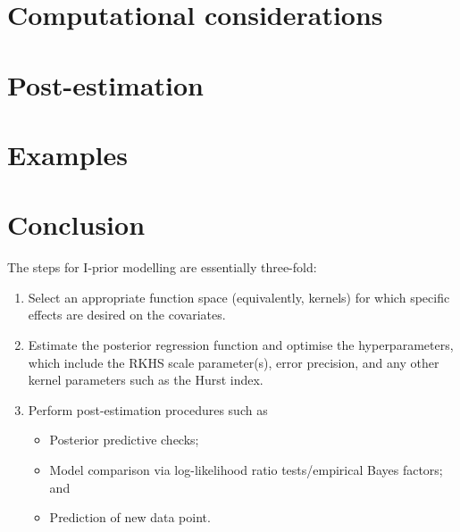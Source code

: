 \documentclass[a4paper,showframe,11pt]{report}
\begin{document}
\section{Computational considerations}\label{sec:ipriorcompcons}


\section{Post-estimation}\label{sec:ipriorpostest}


\section{Examples}\label{sec:ipriorexamples}


\newpage
\section{Conclusion}

The steps for I-prior modelling are essentially three-fold:
\begin{enumerate}
  \item Select an appropriate function space (equivalently, kernels) for which specific effects are desired on the covariates. 
  \item Estimate the posterior regression function and optimise the hyperparameters, which include the RKHS scale parameter(s), error precision, and any other kernel parameters such as the Hurst index.
  \item Perform post-estimation procedures such as
  \begin{itemize}
    \item Posterior predictive checks;
    \item Model comparison via log-likelihood ratio tests/empirical Bayes factors; and
    \item Prediction of new data point.
  \end{itemize}
\end{enumerate}
\end{document}
